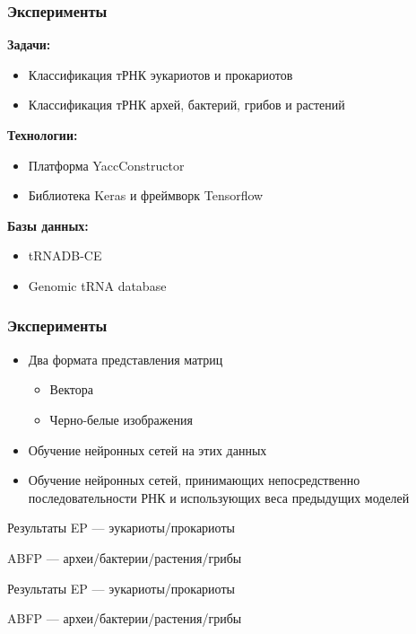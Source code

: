\documentclass{beamer}
\begin{document}
\begin{frame}\frametitle{Эксперименты}
\textbf{Задачи:}
\begin{itemize}
    \item Классификация тРНК эукариотов и прокариотов
    \item Классификация тРНК архей, бактерий, грибов и растений
\end{itemize}
\vspace{6mm}
\textbf{Технологии:}
\begin{itemize}
    \item Платформа YaccConstructor
    \item Библиотека Keras и фреймворк Tensorflow
\end{itemize}
\vspace{6mm}
\textbf{Базы данных:}
\begin{itemize}
    \item tRNADB-CE
    \item Genomic tRNA database
\end{itemize}
\end{frame}

\begin{frame}\frametitle{Эксперименты}
    \begin{itemize}
        \item Два формата представления матриц
        \begin{itemize}
            \item Вектора
            \item Черно-белые изображения
        \end{itemize}
        \item Обучение нейронных сетей на этих данных
        \item Обучение нейронных сетей, принимающих непосредственно последовательности РНК и использующих веса предыдущих моделей
    \end{itemize}
\end{frame}

\begin{frame}{Результаты}
EP --- эукариоты/прокариоты

ABFP --- археи/бактерии/растения/грибы
\vspace{5mm}

\end{frame}

\begin{frame}{Результаты}
EP --- эукариоты/прокариоты

ABFP --- археи/бактерии/растения/грибы
\vspace{5mm}

\end{frame}
\end{document}
